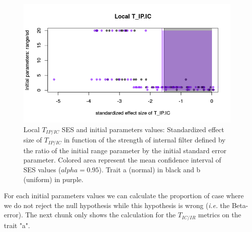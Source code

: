 \documentclass[12pt]{article}\usepackage[]{graphicx}\usepackage[]{color}
\makeatletter
\def\maxwidth{ %
  \ifdim\Gin@nat@width>\linewidth
    \linewidth
  \else
    \Gin@nat@width
  \fi
}
\newenvironment{knitrout}{}{} %
\makeatother
\begin{document}
\begin{knitrout}
\begin{figure}
{\centering \includegraphics[width=\maxwidth]{figure/In_filter_results_plot_initparam-1} 

}

\caption[Local $T_{IP/IC}$ SES and initial parameters values]{Local $T_{IP/IC}$ SES and initial parameters values: Standardized effect size of $T_{IP/IC}$ in function of the strength of internal filter defined by the ratio of the initial range parameter by the initial standard error parameter. Colored area represent the mean confidence interval of SES values ($alpha = 0.95$). Trait a (normal) in black and b (uniform) in purple.}\label{fig:In_filter_results_plot_initparam}
\end{figure}


\end{knitrout}
 
  
For each initial parameters values we can calculate the proportion of case where we do not reject the null hypothesis while this hypothesis is wrong (\textit{i.e.} the Beta-error). The next chunk only shows the calculation for the $T_{IC/IR}$ metrics on the trait "a".
\end{document}
